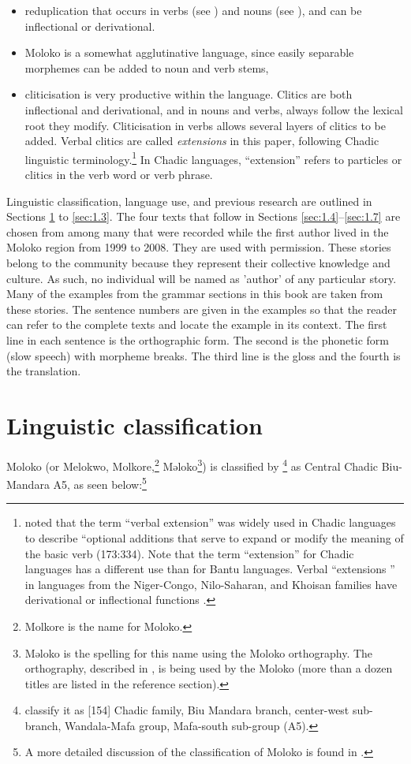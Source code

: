 \begin{itemize}
\item reduplication that occurs in verbs (see ) and nouns (see ), and can be inflectional or derivational.  
\item Moloko is a somewhat agglutinative language, since easily separable morphemes can be added to noun and verb stems,
\item cliticisation is very productive within the language. Clitics are both inflectional and derivational, and in nouns and verbs, always follow the lexical root they modify. Cliticisation in verbs allows several layers of clitics to be added. Verbal clitics are called \textit{extensions} in this paper, following Chadic linguistic terminology.\footnote{\citet{Newman1973} noted that the term ``verbal extension'' was widely used in Chadic languages to describe “optional additions that serve to expand or modify the meaning of the basic verb (173:334). Note that the term ``extension'' for Chadic languages has a different use than for Bantu languages. Verbal ``extensions '' in languages from the Niger-Congo, Nilo-Saharan, and Khoisan families have derivational or inflectional functions \citep{Hyman2007}. } In Chadic languages, ``extension'' refers to particles or clitics in the verb word or verb phrase.
\end{itemize}

Linguistic classification, language use, and previous research are outlined in Sections \ref{sec:1.1} to \ref{sec:1.3}. The four texts that follow in Sections \ref{sec:1.4}--\ref{sec:1.7} are chosen from among many that were recorded while the first author lived in the Moloko region from 1999 to 2008. They are used with permission. These stories belong to the community because they represent their collective knowledge and culture. As such, no individual will be named as 'author' of any particular story. Many of the examples from the grammar sections in this book are taken from these stories. The sentence numbers are given in the examples so that the reader can refer to the complete texts and locate the example in its context. The first line in each sentence is the orthographic form. The second is the phonetic form (slow speech) with morpheme breaks. The third line is the gloss and the fourth is the translation.

\section{Linguistic classification}\label{sec:1.1}
\hypertarget{RefHeading1210261525720847}{}
Moloko (or Melokwo, Molkore,\footnote{Molkore is the  name for Moloko.} Məloko\footnote{Məloko is the spelling for this name using the Moloko orthography. The orthography, described in \citet{Friesen2001}, is being used by the Moloko (more than a dozen titles are listed in the reference section).}) is classified by \citet{LewisSimonsFennig2009}\footnote{\citet{DieuRenaud1983} classify it as [154] Chadic family, Biu Mandara branch, center-west sub-branch, Wandala-Mafa group, Mafa-south sub-group (A5).} as Central Chadic Biu-Mandara A5, as seen below:\footnote{A more detailed discussion of the classification of Moloko is found in \citet{Bow1997a}.}  

